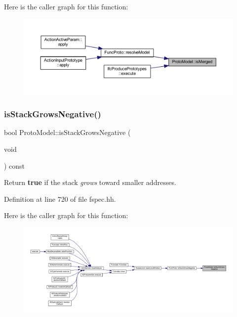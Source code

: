 Here is the caller graph for this function\+:
\nopagebreak
\begin{figure}[H]
\begin{center}
\leavevmode
\includegraphics[width=350pt]{class_proto_model_a580207b945d3734b6f1e6023b3ca2678_icgraph}
\end{center}
\end{figure}
\mbox{\label{class_proto_model_a9fd453910b4e750e3c67f26969c17001}} 
\subsubsection{\texorpdfstring{isStackGrowsNegative()}{isStackGrowsNegative()}}
{\footnotesize\ttfamily bool Proto\+Model\+::is\+Stack\+Grows\+Negative (\begin{DoxyParamCaption}\item[{void}]{ }\end{DoxyParamCaption}) const\hspace{0.3cm}{\ttfamily [inline]}}



Return {\bfseries{true}} if the stack {\itshape grows} toward smaller addresses. 



Definition at line 720 of file fspec.\+hh.

Here is the caller graph for this function\+:
\nopagebreak
\begin{figure}[H]
\begin{center}
\leavevmode
\includegraphics[width=350pt]{class_proto_model_a9fd453910b4e750e3c67f26969c17001_icgraph}
\end{center}
\end{figure}
\mbox{\label{class_proto_model_aec744a55c36bed8f08fa923fad80df46}} 
